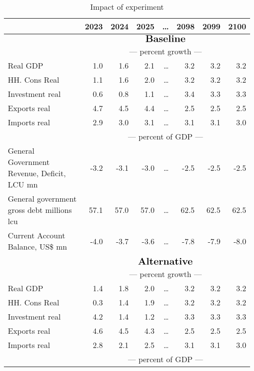 \documentclass{article}
\begin{document}
\begin{table}[ht]
\caption{Impact of experiment}
\begin{tabular}{lrrrrrrr}
\toprule
 & 2023 & 2024 & 2025 & \dots & 2098 & 2099 & 2100 \\
\midrule
&\multicolumn{7}{c}{{$\Large \textbf{Baseline}$}}                                                          \\
&\multicolumn{7}{c}{{---  percent growth ---}}                                                         \\
Real GDP & 1.0 & 1.6 & 2.1 & \dots & 3.2 & 3.2 & 3.2 \\
HH. Cons Real & 1.1 & 1.6 & 2.0 & \dots & 3.2 & 3.2 & 3.2 \\
Investment real & 0.6 & 0.8 & 1.1 & \dots & 3.4 & 3.3 & 3.3 \\
Exports real & 4.7 & 4.5 & 4.4 & \dots & 2.5 & 2.5 & 2.5 \\
Imports real & 2.9 & 3.0 & 3.1 & \dots & 3.1 & 3.1 & 3.0 \\
&\multicolumn{7}{c}{{---  percent of GDP ---}}                                                             \\
General Government Revenue, Deficit, LCU mn & -3.2 & -3.1 & -3.0 & \dots & -2.5 & -2.5 & -2.5 \\
General government gross debt millions lcu & 57.1 & 57.0 & 57.0 & \dots & 62.5 & 62.5 & 62.5 \\
Current Account Balance, US\$ mn & -4.0 & -3.7 & -3.6 & \dots & -7.8 & -7.9 & -8.0 \\
&\multicolumn{7}{c}{{ }}                               & \dots                               \\
&\multicolumn{7}{c}{{$\Large \textbf{Alternative}$}}                                                         \\
&\multicolumn{7}{c}{{---  percent growth ---}}                                                           \\
Real GDP & 1.4 & 1.8 & 2.0 & \dots & 3.2 & 3.2 & 3.2 \\
HH. Cons Real & 0.3 & 1.4 & 1.9 & \dots & 3.2 & 3.2 & 3.2 \\
Investment real & 4.2 & 1.4 & 1.2 & \dots & 3.3 & 3.3 & 3.3 \\
Exports real & 4.6 & 4.5 & 4.3 & \dots & 2.5 & 2.5 & 2.5 \\
Imports real & 2.8 & 2.1 & 2.5 & \dots & 3.1 & 3.1 & 3.0 \\
&\multicolumn{7}{c}{{---  percent of GDP ---}}                                                             \\

\end{tabular}
\end{table}
\end{document}
